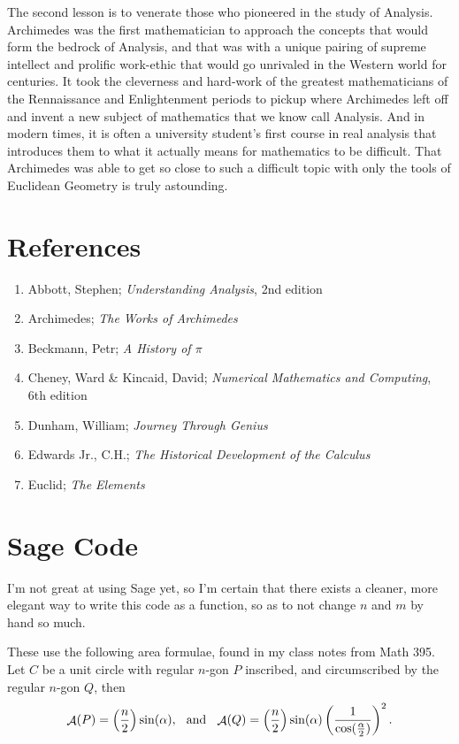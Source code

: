 \documentclass[letterpaper, 12pt]{amsart}
\DeclareMathOperator{\A}{\mathcal{A}}
\theoremstyle{definition}  %
\begin{document}
	The second lesson is to venerate those who pioneered in the study of Analysis.
	Archimedes was the first mathematician to approach the concepts that would form the bedrock of Analysis, and that was with a unique pairing of supreme intellect and prolific work-ethic that would go unrivaled in the Western world for centuries.
	It took the cleverness and hard-work of the greatest mathematicians of the Rennaissance and Enlightenment periods to pickup where Archimedes left off and invent a new subject of mathematics that we know call Analysis.
	And in modern times, it is often a university student's first course in real analysis that introduces them to what it actually means for mathematics to be difficult.
	That Archimedes was able to get so close to such a difficult topic with only the tools of Euclidean Geometry is truly astounding.
	\newpage

	\appendix

	\section{References}
	\label{sec:references}
	\begin{enumerate}
		\item Abbott, Stephen; \textit{Understanding Analysis}, 2nd edition
		\item Archimedes; \textit{The Works of Archimedes}
		\item Beckmann, Petr; \textit{A History of $\pi$}
		\item Cheney, Ward \& Kincaid, David; \textit{Numerical Mathematics and Computing}, 6th edition
		\item Dunham, William; \textit{Journey Through Genius}
		\item Edwards Jr., C.H.; \textit{The Historical Development of the Calculus}
		\item Euclid; \textit{The Elements}
	\end{enumerate}

	\section{Sage Code}
	\label{sec:sage_code}
	I'm not great at using Sage yet, so I'm certain that there exists a cleaner, more elegant way to write this code as a function, so as to not change $n$ and $m$ by hand so much.

	These use the following area formulae, found in my class notes from Math 395.
	Let $C$ be a unit circle with regular $n$-gon $P$ inscribed, and circumscribed by the regular $n$-gon $Q$, then \[ \A(P) = \left(\frac{n}{2} \right) \sin(\alpha), \hspace{2.5mm} \text{and} \hspace{2.5mm} \A(Q) = \left(\frac{n}{2} \right)\sin(\alpha)\left(\frac{1}{\cos(\tfrac{\alpha}{2})}\right)^{2}. \]
\end{document}
